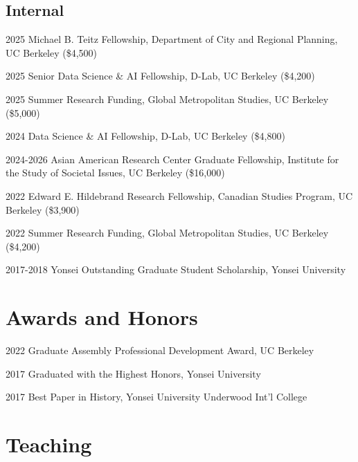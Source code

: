 \documentclass[11pt,letterpaper]{report}
\begin{document}
\subsection*{Internal}
\begin{tablist}
\item[2025] \tab{}Michael B. Teitz Fellowship, Department of City and Regional Planning, UC Berkeley (\$4,500)
\item[2025] \tab{}Senior Data Science \& AI Fellowship, D-Lab, UC Berkeley (\$4,200)
\item[2025] \tab{}Summer Research Funding, Global Metropolitan Studies, UC Berkeley (\$5,000)
\item[2024] \tab{}Data Science \& AI Fellowship, D-Lab, UC Berkeley (\$4,800)
\item[2024-2026] \tab{}Asian American Research Center Graduate Fellowship, Institute for the Study of Societal Issues, UC Berkeley (\$16,000)
\item[2022] \tab{}Edward E. Hildebrand Research Fellowship, Canadian Studies Program, UC Berkeley (\$3,900)
\item[2022] \tab{}Summer Research Funding, Global Metropolitan Studies, UC Berkeley (\$4,200)
\item[2017-2018] \tab{}Yonsei Outstanding Graduate Student Scholarship, Yonsei University
\end{tablist}

\section*{Awards and Honors}
\begin{tablist}
\item[2022] \tab{}Graduate Assembly Professional Development Award, UC Berkeley
\item[2017] \tab{}Graduated with the Highest Honors, Yonsei University
\item[2017] \tab{}Best Paper in History, Yonsei University Underwood Int'l College
\end{tablist}

\section*{Teaching}
\end{document}
